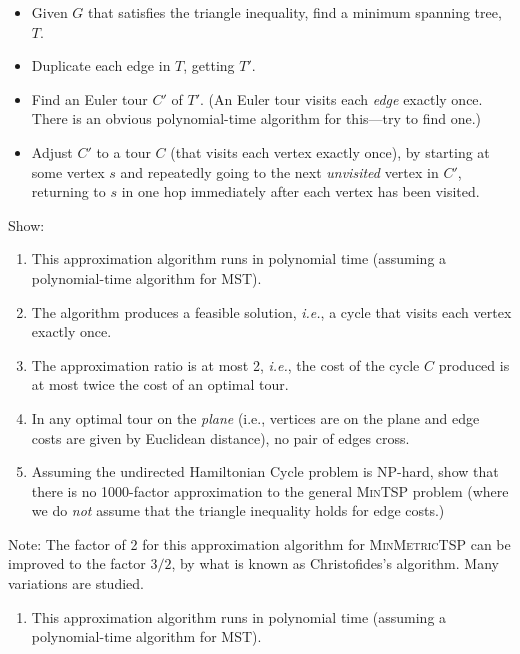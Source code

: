 \documentclass[2pt]{scrartcl}
\begin{document}
\begin{multicols}{6}
{\begin{itemize}
\item Given $G$ that satisfies the triangle inequality, find a minimum
  spanning tree, $T$.
\item Duplicate each edge in $T$, getting $T'$.
\item Find an Euler tour $C'$ of $T'$.  (An Euler tour visits each
  {\em edge} exactly once.  There is an obvious polynomial-time
  algorithm for this---try to find one.)
\item Adjust $C'$ to a tour $C$ (that visits each vertex exactly
  once), by starting at some vertex $s$ and repeatedly going to the next
  {\em unvisited} vertex in $C'$, returning to $s$ in one hop
  immediately after each vertex has been visited.
\end{itemize}

Show:
\begin{enumerate}
\item This approximation algorithm runs in polynomial time (assuming a
  polynomial-time algorithm for \textsc{MST}).
\item The algorithm produces a feasible solution, {\em i.e.}, a cycle
  that visits each vertex exactly once.
\item The approximation ratio is at most 2, {\em i.e.}, the cost of
  the cycle $C$ produced is at most twice the cost of an optimal tour.
\item In any optimal tour on the {\em plane} (i.e., vertices are on
  the plane and edge costs are given by Euclidean distance), no pair
  of edges cross.
\item Assuming the undirected Hamiltonian Cycle problem is NP-hard,
  show that there is no 1000-factor approximation to the general
  \textsc{MinTSP} problem (where we do {\em not} assume that the
  triangle inequality holds for edge costs.)
\end{enumerate}

Note: The factor of 2 for this approximation algorithm for
\textsc{MinMetricTSP} can be improved to the factor $3/2$, by what is
known as Christofides's algorithm.  Many variations are studied.}

            \begin{enumerate}
\item This approximation algorithm runs in polynomial time (assuming a
  polynomial-time algorithm for \textsc{MST}).


\end{enumerate}
\end{multicols}
\end{document}
